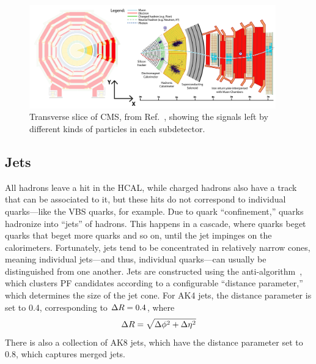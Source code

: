 \begin{figure}[htb]
    \centering
    \includegraphics[width=0.95\textwidth]{fig/cms/particle_id_slice.pdf}
    \caption{
        Transverse slice of CMS, from Ref.~\cite{Davis:2205172}, showing the signals left by different kinds of particles in each subdetector.
    }
    \label{fig:cms_particle_id}
\end{figure}

\subsection{Jets}
All hadrons leave a hit in the HCAL, while charged hadrons also have a track that can be associated to it, but these hits do not correspond to individual quarks---like the VBS quarks, for example. 
Due to quark ``confinement,'' quarks hadronize into ``jets'' of hadrons. 
This happens in a cascade, where quarks beget quarks that beget more quarks and so on, until the jet impinges on the calorimeters. 
Fortunately, jets tend to be concentrated in relatively narrow cones, meaning individual jets---and thus, individual quarks---can usually be distinguished from one another. 
Jets are constructed using the anti-\kt algorithm~\cite{Cacciari:2008gp, Cacciari:2011ma}, which clusters PF candidates according to a configurable ``distance parameter,'' which determines the size of the jet cone. 
For AK4 jets, the distance parameter is set to 0.4, corresponding to $\Delta R = 0.4$, where
\begin{equation}
    \Delta R = \sqrt{\Delta\phi^2 + \Delta\eta^2}
\end{equation}
There is also a collection of AK8 jets, which have the distance parameter set to 0.8, which captures merged jets.

